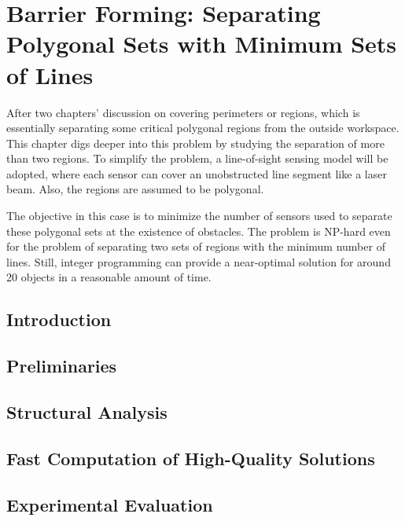 \chapter{Barrier Forming: Separating Polygonal Sets with Minimum Sets of Lines}\label{ch:bf}
\thispagestyle{myheadings}

After two chapters' discussion on covering perimeters or regions, which is essentially separating 
some critical polygonal regions from the outside workspace. 
This chapter digs deeper into this problem by studying the separation of more than two regions. 
To simplify the problem, a line-of-sight sensing model will be adopted, where each sensor can cover
an unobstructed line segment like a laser beam. Also, the regions are assumed to be polygonal.

The objective in this case is to minimize the number of sensors used to separate these polygonal sets 
at the existence of obstacles.
The problem is NP-hard even for the problem of separating two sets of regions with the minimum number of lines. 
Still, integer programming can provide a near-optimal solution for around 20 objects in a reasonable amount of time. 

\section{Introduction}
\label{sec:bf-intro}

\section{Preliminaries}\label{sec:bf-preliminary}


\section{Structural Analysis}\label{sec:bf-structure}


\section{Fast Computation of High-Quality Solutions}\label{sec:bf-algorithm}


\section{Experimental Evaluation}\label{sec:bf-evaluation}

